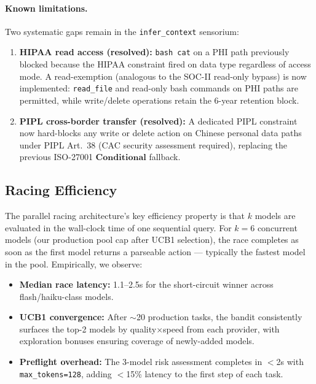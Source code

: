 \documentclass[11pt,twocolumn]{article}
\begin{document}
\paragraph{Known limitations.}
Two systematic gaps remain in the \texttt{infer\_context} sensorium:
\begin{enumerate}
  \item \textbf{HIPAA read access (resolved):} \texttt{bash cat} on a PHI path
  previously blocked because the HIPAA constraint fired on data type regardless
  of access mode. A read-exemption (analogous to the SOC-II read-only bypass)
  is now implemented: \texttt{read\_file} and read-only bash commands on PHI
  paths are permitted, while write/delete operations retain the 6-year
  retention block.
  \item \textbf{PIPL cross-border transfer (resolved):} A dedicated PIPL
  constraint now hard-blocks any write or delete action on Chinese
  personal data paths under PIPL Art.~38 (CAC security assessment required),
  replacing the previous ISO-27001 $\mathbf{Conditional}$ fallback.
\end{enumerate}

\subsection{Racing Efficiency}

The parallel racing architecture's key efficiency property is that $k$ models
are evaluated in the wall-clock time of one sequential query. For $k = 6$
concurrent models (our production pool cap after UCB1 selection), the race
completes as soon as the first model returns a parseable action — typically
the fastest model in the pool. Empirically, we observe:

\begin{itemize}
  \item \textbf{Median race latency:} 1.1--2.5s for the short-circuit winner
  across flash/haiku-class models.
  \item \textbf{UCB1 convergence:} After $\sim$20 production tasks, the bandit
  consistently surfaces the top-2 models by quality$\times$speed from each provider,
  with exploration bonuses ensuring coverage of newly-added models.
  \item \textbf{Preflight overhead:} The 3-model risk assessment completes in
  $<$2s with \texttt{max\_tokens=128}, adding $<$15\% latency to the first step
  of each task.
\end{itemize}
\end{document}
